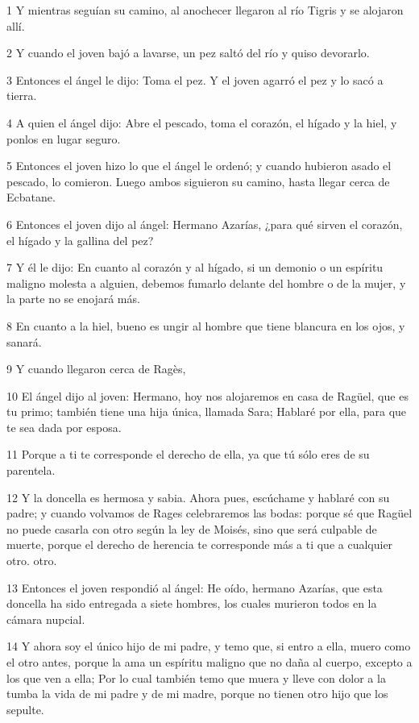 \par 1 Y mientras seguían su camino, al anochecer llegaron al río Tigris y se alojaron allí.
\par 2 Y cuando el joven bajó a lavarse, un pez saltó del río y quiso devorarlo.
\par 3 Entonces el ángel le dijo: Toma el pez. Y el joven agarró el pez y lo sacó a tierra.
\par 4 A quien el ángel dijo: Abre el pescado, toma el corazón, el hígado y la hiel, y ponlos en lugar seguro.
\par 5 Entonces el joven hizo lo que el ángel le ordenó; y cuando hubieron asado el pescado, lo comieron. Luego ambos siguieron su camino, hasta llegar cerca de Ecbatane.
\par 6 Entonces el joven dijo al ángel: Hermano Azarías, ¿para qué sirven el corazón, el hígado y la gallina del pez?
\par 7 Y él le dijo: En cuanto al corazón y al hígado, si un demonio o un espíritu maligno molesta a alguien, debemos fumarlo delante del hombre o de la mujer, y la parte no se enojará más.
\par 8 En cuanto a la hiel, bueno es ungir al hombre que tiene blancura en los ojos, y sanará.
\par 9 Y cuando llegaron cerca de Ragès,
\par 10 El ángel dijo al joven: Hermano, hoy nos alojaremos en casa de Ragüel, que es tu primo; también tiene una hija única, llamada Sara; Hablaré por ella, para que te sea dada por esposa.
\par 11 Porque a ti te corresponde el derecho de ella, ya que tú sólo eres de su parentela.
\par 12 Y la doncella es hermosa y sabia. Ahora pues, escúchame y hablaré con su padre; y cuando volvamos de Rages celebraremos las bodas: porque sé que Ragüel no puede casarla con otro según la ley de Moisés, sino que será culpable de muerte, porque el derecho de herencia te corresponde más a ti que a cualquier otro. otro.
\par 13 Entonces el joven respondió al ángel: He oído, hermano Azarías, que esta doncella ha sido entregada a siete hombres, los cuales murieron todos en la cámara nupcial.
\par 14 Y ahora soy el único hijo de mi padre, y temo que, si entro a ella, muero como el otro antes, porque la ama un espíritu maligno que no daña al cuerpo, excepto a los que ven a ella; Por lo cual también temo que muera y lleve con dolor a la tumba la vida de mi padre y de mi madre, porque no tienen otro hijo que los sepulte.
